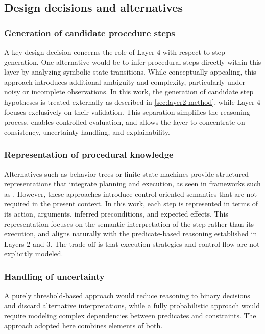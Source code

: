 \documentclass[11pt,titlepage,openright]{book}
\begin{document}

\subsection{Design decisions and alternatives}
\label{sub:layer4-method-design-decisions}

\subsubsection{Generation of candidate procedure steps}

A key design decision concerns the role of Layer 4 with respect to step generation. One alternative would be to infer procedural steps directly within this layer by analyzing symbolic state transitions. While conceptually appealing, this approach introduces additional ambiguity and complexity, particularly under noisy or incomplete observations. In this work, the generation of candidate step hypotheses is treated externally as described in \cref{sec:layer2-method}, while Layer 4 focuses exclusively on their validation. This separation simplifies the reasoning process, enables controlled evaluation, and allows the layer to concentrate on consistency, uncertainty handling, and explainability.

\subsubsection{Representation of procedural knowledge}
Alternatives such as behavior trees or finite state machines provide structured representations that integrate planning and execution, as seen in frameworks such as \citep{Zhao2025VideoToBT}. However, these approaches introduce control-oriented semantics that are not required in the present context. In this work, each step is represented in terms of its action, arguments, inferred preconditions, and expected effects. This representation focuses on the semantic interpretation of the step rather than its execution, and aligns naturally with the predicate-based reasoning established in Layers 2 and 3. The trade-off is that execution strategies and control flow are not explicitly modeled.

\subsubsection{Handling of uncertainty}

A purely threshold-based approach would reduce reasoning to binary decisions and discard alternative interpretations, while a fully probabilistic approach would require modeling complex dependencies between predicates and constraints. The approach adopted here combines elements of both.
\end{document}
